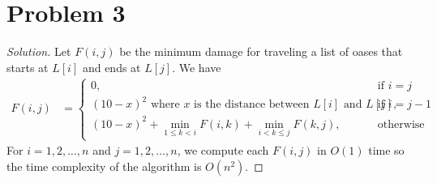 \documentclass[12pt]{article}
\newenvironment*{solution}{\begin{proof}[Solution]}{\end{proof}}
\begin{document}
\section*{Problem 3}
\begin{solution}
    Let \(F(i,j)\) be the minimum damage for traveling a list of oases that
    starts at \(L[i]\) and ends at \(L[j]\). We have
    \begin{align*}
        F(i,j) &= \begin{cases}
            0, &\text{if \(i=j\)} \\
            (10-x)^2 \text{ where \(x\) is the distance between \(L[i]\) and
            \(L[j]\)}, &\text{if \(i=j-1\)} \\
            (10-x)^2+\min_{1\leq k<i} F(i,k)+\min_{i<k\leq j} F(k,j),
            &\text{otherwise}
        \end{cases}
    \end{align*}
    For \(i=1,2,\dots,n\) and \(j=1,2,\dots,n\), we compute each \(F(i,j)\) in
    \(O(1)\) time so the time complexity of the algorithm is \(O(n^2)\).
\end{solution}
\end{document}

